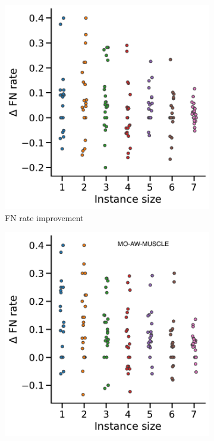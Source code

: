 \begin{figure}[!htbp]
\begin{adjustwidth}{-1.2cm}{}
\begin{subfigure}{0.40\textwidth}
		\end{subfigure}
		\begin{subfigure}{0.40\textwidth} \includegraphics[width=\textwidth]{Figure/delta4-ml} \caption{ FN rate improvement}\label{fig:scatter-ml}\end{subfigure}
		\begin{subfigure}{0.40\textwidth} \includegraphics[width=\textwidth]{Figure/delta4-momuscle} 
		\end{subfigure}
		

\end{adjustwidth}
\end{figure}

